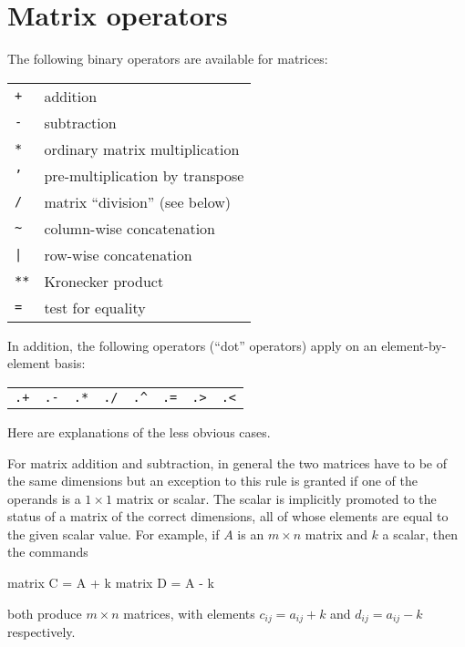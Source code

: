 \section{Matrix operators}
\label{matrix-op}

The following binary operators are available for matrices:

\begin{center}
\begin{tabular}{ll}
\texttt{+}  & addition \\
\texttt{-}  & subtraction \\
\texttt{*}  & ordinary matrix multiplication \\
\texttt{'}  & pre-multiplication by transpose \\
\texttt{/}  & matrix ``division'' (see below) \\
\verb+~+    & column-wise concatenation \\
\verb+|+    & row-wise concatenation \\
\texttt{**} & Kronecker product \\
\texttt{=}  & test for equality 
\end{tabular}
\end{center}

In addition, the following operators (``dot'' operators) apply on an
element-by-element basis:

\begin{center}
\begin{tabular}{cccccccc}
\texttt{.+}  &  \texttt{.-}  &
\texttt{.*}  &  \texttt{./}  &  \verb+.^+  &
\texttt{.=}  &  \texttt{.>}  &  \texttt{.<} 
\end{tabular}
\end{center}

Here are explanations of the less obvious cases. 

For matrix addition and subtraction, in general the two matrices have
to be of the same dimensions but an exception to this rule is granted
if one of the operands is a $1\times 1$ matrix or scalar.  The scalar
is implicitly promoted to the status of a matrix of the correct
dimensions, all of whose elements are equal to the given scalar value.
For example, if $A$ is an $m \times n$ matrix and $k$ a scalar, then
the commands
%
\begin{code}
matrix C = A + k
matrix D = A - k
\end{code}
%
both produce $m \times n$ matrices, with elements $c_{ij} = 
a_{ij} + k$ and $d_{ij} = a_{ij} - k$ respectively.

